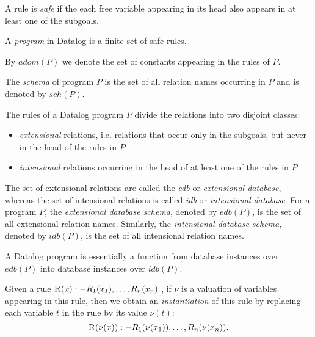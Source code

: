 \begin{defn}
A rule is \emph{safe} if the each free variable appearing in its head also appears in at least one of the subgoals.
\end{defn}\label{d:datalogsaferule}

\begin{defn}
A \emph{program} in Datalog is a finite set of safe rules.
\end{defn}\label{d:datalogprog}

By $adom(P)$ we denote the set of constants appearing in the rules of $P$.

The \emph{schema} of program $P$ is the set of all relation names occurring in $P$ and is denoted by $sch(P)$.

\begin{defn}
The rules of a Datalog program $P$ divide the relations into two disjoint classes: 
\begin{itemize}
\item \emph{extensional} relations, i.e. relations that occur only in the subgoals, but never in the head of the rules in $P$
\item \emph{intensional} relations occurring in the head of at least one of the rules in $P$
\end{itemize}
\end{defn}

The set of extensional relations are called the \emph{edb} or \emph{extensional database}, whereas the set of intensional relations is called \emph{idb} or \emph{intensional database}. For a program $P$, the \emph{extensional database schema}, denoted by $edb(P)$, is the set of all extensional relation names. Similarly, the \emph{intensional database schema}, denoted by $idb(P)$, is the set of all intensional relation names. 

A Datalog program is essentially a function from database instances over $edb(P)$ into database instances over $idb(P)$.

\begin{defn}
Given a rule $ \textsc{R}(x) :- R_1(x_1), \dots, R_n(x_n). $, if $\nu$ is a valuation of variables appearing in this rule, then we obtain an \emph{instantiation} of this rule by replacing each variable $t$ in the rule by its value $\nu(t)$:
$$ \textsc{R}(\nu(x)) :- R_1(\nu(x_1)), \dots, R_n(\nu(x_n)). $$
\end{defn}

